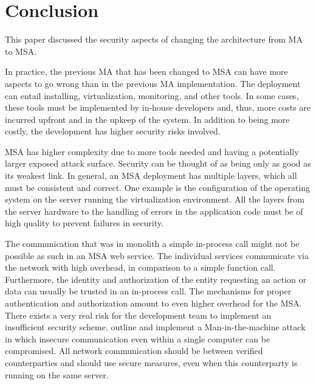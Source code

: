 \section{Conclusion}
\begin{sloppypar}
    This paper discussed the security aspects of changing the architecture from
    MA to MSA.
\end{sloppypar}
\begin{sloppypar}
    In practice, the previous MA that has been changed to MSA can have more
    aspects to go wrong than in the previous MA implementation. The deployment
    can entail installing, virtualization, monitoring, and other tools. In some
    cases, these tools must be implemented by in-house developers and, thus,
    more costs are incurred upfront and in the upkeep of the system. In addition
    to being more costly, the development has higher security risks involved.
\end{sloppypar}
\begin{sloppypar}
    MSA has higher complexity due to more tools needed and having a potentially larger exposed attack surface. Security can be thought of as being only
    as good as its weakest link. In general, an MSA deployment has multiple
    layers, which all must be consistent and correct. One example is the
    configuration of the operating system on the server running the
    virtualization environment. All the layers from the server hardware to the
    handling of errors in the application code must be of high quality to
    prevent failures in security.
\end{sloppypar}
\begin{sloppypar}
    The communication that was in monolith a simple in-process call might not be
    possible as such in an MSA web service. The individual services communicate
    via the network with high overhead, in comparison to a simple function call.
    Furthermore, the identity and authorization of the entity requesting an
    action or data can usually be trusted in an in-process call. The mechanisms
    for proper authentication and authorization amount to even higher overhead
    for the MSA. There exists a very real risk for the development team to
    implement an insufficient security scheme. \citet{maninthemachine} outline
    and implement a Man-in-the-machine attack in which insecure
    communication even within a single computer can be compromised. All network
    communication should be between verified counterparties and should use
    secure measures, even when this counterparty is running on the same
    server.
\end{sloppypar}
